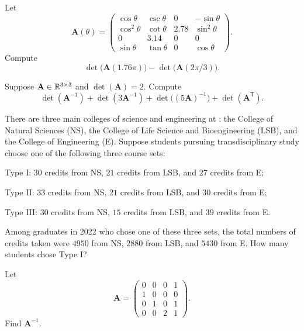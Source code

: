 \documentclass[11pt,oneside]{article}
\begin{document}
\begin{problem}
\begin{problemsubparts}
\item Let
\[
\mathbf A(\theta)=
\begin{pmatrix}
\cos\theta & \csc\theta & 0 & -\sin\theta\\
\cos^2\theta & \cot\theta & 2.78 & \sin^2\theta\\
0 & 3.14 & 0 & 0\\
\sin\theta & \tan\theta & 0 & \cos\theta
\end{pmatrix}.
\]
Compute
\[
\det\bigl(\mathbf A(1.76\pi)\bigr)-\det\bigl(\mathbf A(2\pi/3)\bigr).
\]
\item Suppose $\mathbf A\in\mathbb{R}^{3\times3}$ and $\det(\mathbf A)=2$. Compute
\[
\det(\mathbf A^{-1})+\det(3\mathbf A^{-1})+\det\bigl((5\mathbf A)^{-1}\bigr)+\det(\mathbf A^{\mathsf T}).
\]
\end{problemsubparts}
\end{problem}

\begin{problem}
There are three main colleges of science and engineering at \KAIST{}: the College of Natural Sciences (NS), the College of Life Science and Bioengineering (LSB), and the College of Engineering (E). Suppose students pursuing transdisciplinary study choose one of the following three course sets:
\begin{problemchoices}
\item Type I: $30$ credits from NS, $21$ credits from LSB, and $27$ credits from E;
\item Type II: $33$ credits from NS, $21$ credits from LSB, and $30$ credits from E;
\item Type III: $30$ credits from NS, $15$ credits from LSB, and $39$ credits from E.
\end{problemchoices}
Among graduates in 2022 who chose one of these three sets, the total numbers of credits taken were $4950$ from NS, $2880$ from LSB, and $5430$ from E. How many students chose Type I?
\end{problem}

\begin{problem}
Let
\[
\mathbf A=
\begin{pmatrix}
0&0&0&1\\
1&0&0&0\\
0&1&0&1\\
0&0&2&1
\end{pmatrix}.
\]
Find $\mathbf A^{-1}$.
\end{problem}
\end{document}
